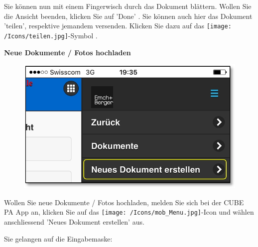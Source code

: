 Sie können nun mit einem Fingerwisch durch das Dokument blättern. Wollen Sie die Ansicht beenden, klicken Sie auf 'Done' . Sie können auch hier das Dokument 'teilen', respektive jemandem versenden. Klicken Sie dazu auf das \texttt{[image: /Icons/teilen.jpg]}-Symbol .

\pagebreak

\textbf{Neue Dokumente / Fotos hochladen}

\vspace{\baselineskip}

\begin{figure}   %
  \vspace{-35pt}      %
  \begin{center}
    \includegraphics[width=1\linewidth]{../chapters/11_Dokumentenablage/pictures/11-mob03_Dokumente_hochladen.jpg}
  \end{center}
  \vspace{-20pt}
  \vspace{-10pt}
\end{figure}

Wollen Sie neue Dokumente / Fotos hochladen, melden Sie sich bei der CUBE PA App an, klicken Sie auf das \texttt{[image: /Icons/mob\_Menu.jpg]}-Icon und wählen anschliessend 'Neues Dokument erstellen' aus.

\vspace{\baselineskip}

Sie gelangen auf die Eingabemaske:

\vspace{\baselineskip}

